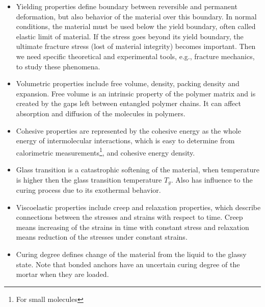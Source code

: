 \begin{itemize}
	\item 	Yielding properties define boundary between reversible and permanent deformation, but also behavior of the material over this boundary. In normal conditions, the material must be used below the yield boundary, often called elastic limit of material. If the stress goes beyond its yield boundary, the ultimate fracture stress (lost of material integrity) becomes important. Then we need specific theoretical and experimental tools, e.g., fracture mechanics, to study these phenomena.
	
	\item Volumetric properties include free volume, density, packing density and expansion. Free volume is an intrinsic property of the polymer matrix and is created by the gaps left between entangled polymer chains. It can affect absorption and diffusion of the molecules in polymers.
	
	\item Cohesive properties are represented by the cohesive energy as the whole energy of intermolecular interactions, which is easy to determine from calorimetric measurements\footnote{For small molecules}, and cohesive energy density.
	
	\item Glass transition is a catastrophic softening of the material, when temperature is higher then the glass transition temperature $T_g$. Also has influence to the curing process due to its exothermal behavior. 
	
	\item Viscoelastic properties include creep and relaxation properties, which describe connections between the stresses and strains with respect to time. Creep means increasing of the strains in time with constant stress and relaxation means reduction of the stresses under constant strains. 
	
	\item Curing degree defines change of the material from the liquid to the glassy state. Note that bonded anchors have an uncertain curing degree of the mortar when they are loaded.
	
\end{itemize}

